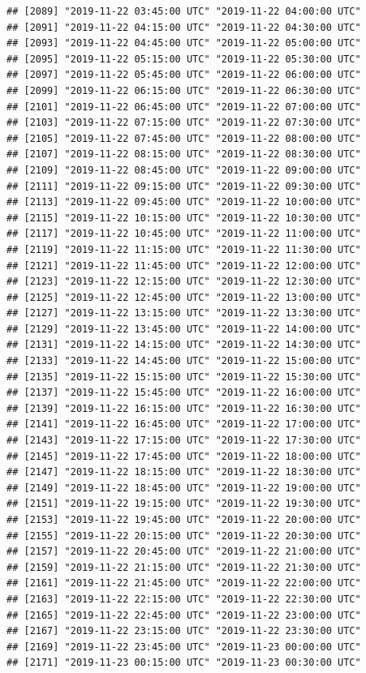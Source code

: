 \documentclass{article}\usepackage[]{graphicx}\usepackage[]{color}
\makeatletter
\newenvironment{kframe}{%
 \def\at@end@of@kframe{}%
 \ifinner\ifhmode%
  \def\at@end@of@kframe{\end{minipage}}%
  \begin{minipage}{\columnwidth}%
 \fi\fi%
 \def\FrameCommand##1{\hskip\@totalleftmargin \hskip-\fboxsep
 \colorbox{shadecolor}{##1}\hskip-\fboxsep
     \hskip-\linewidth \hskip-\@totalleftmargin \hskip\columnwidth}%
 \MakeFramed {\advance\hsize-\width
   \@totalleftmargin\z@ \linewidth\hsize
   \@setminipage}}%
 {\par\unskip\endMakeFramed%
 \at@end@of@kframe}
\newenvironment{knitrout}{}{} %
\makeatother
\begin{document}
\begin{knitrout}
\begin{kframe}
\begin{verbatim}
## [2089] "2019-11-22 03:45:00 UTC" "2019-11-22 04:00:00 UTC"
## [2091] "2019-11-22 04:15:00 UTC" "2019-11-22 04:30:00 UTC"
## [2093] "2019-11-22 04:45:00 UTC" "2019-11-22 05:00:00 UTC"
## [2095] "2019-11-22 05:15:00 UTC" "2019-11-22 05:30:00 UTC"
## [2097] "2019-11-22 05:45:00 UTC" "2019-11-22 06:00:00 UTC"
## [2099] "2019-11-22 06:15:00 UTC" "2019-11-22 06:30:00 UTC"
## [2101] "2019-11-22 06:45:00 UTC" "2019-11-22 07:00:00 UTC"
## [2103] "2019-11-22 07:15:00 UTC" "2019-11-22 07:30:00 UTC"
## [2105] "2019-11-22 07:45:00 UTC" "2019-11-22 08:00:00 UTC"
## [2107] "2019-11-22 08:15:00 UTC" "2019-11-22 08:30:00 UTC"
## [2109] "2019-11-22 08:45:00 UTC" "2019-11-22 09:00:00 UTC"
## [2111] "2019-11-22 09:15:00 UTC" "2019-11-22 09:30:00 UTC"
## [2113] "2019-11-22 09:45:00 UTC" "2019-11-22 10:00:00 UTC"
## [2115] "2019-11-22 10:15:00 UTC" "2019-11-22 10:30:00 UTC"
## [2117] "2019-11-22 10:45:00 UTC" "2019-11-22 11:00:00 UTC"
## [2119] "2019-11-22 11:15:00 UTC" "2019-11-22 11:30:00 UTC"
## [2121] "2019-11-22 11:45:00 UTC" "2019-11-22 12:00:00 UTC"
## [2123] "2019-11-22 12:15:00 UTC" "2019-11-22 12:30:00 UTC"
## [2125] "2019-11-22 12:45:00 UTC" "2019-11-22 13:00:00 UTC"
## [2127] "2019-11-22 13:15:00 UTC" "2019-11-22 13:30:00 UTC"
## [2129] "2019-11-22 13:45:00 UTC" "2019-11-22 14:00:00 UTC"
## [2131] "2019-11-22 14:15:00 UTC" "2019-11-22 14:30:00 UTC"
## [2133] "2019-11-22 14:45:00 UTC" "2019-11-22 15:00:00 UTC"
## [2135] "2019-11-22 15:15:00 UTC" "2019-11-22 15:30:00 UTC"
## [2137] "2019-11-22 15:45:00 UTC" "2019-11-22 16:00:00 UTC"
## [2139] "2019-11-22 16:15:00 UTC" "2019-11-22 16:30:00 UTC"
## [2141] "2019-11-22 16:45:00 UTC" "2019-11-22 17:00:00 UTC"
## [2143] "2019-11-22 17:15:00 UTC" "2019-11-22 17:30:00 UTC"
## [2145] "2019-11-22 17:45:00 UTC" "2019-11-22 18:00:00 UTC"
## [2147] "2019-11-22 18:15:00 UTC" "2019-11-22 18:30:00 UTC"
## [2149] "2019-11-22 18:45:00 UTC" "2019-11-22 19:00:00 UTC"
## [2151] "2019-11-22 19:15:00 UTC" "2019-11-22 19:30:00 UTC"
## [2153] "2019-11-22 19:45:00 UTC" "2019-11-22 20:00:00 UTC"
## [2155] "2019-11-22 20:15:00 UTC" "2019-11-22 20:30:00 UTC"
## [2157] "2019-11-22 20:45:00 UTC" "2019-11-22 21:00:00 UTC"
## [2159] "2019-11-22 21:15:00 UTC" "2019-11-22 21:30:00 UTC"
## [2161] "2019-11-22 21:45:00 UTC" "2019-11-22 22:00:00 UTC"
## [2163] "2019-11-22 22:15:00 UTC" "2019-11-22 22:30:00 UTC"
## [2165] "2019-11-22 22:45:00 UTC" "2019-11-22 23:00:00 UTC"
## [2167] "2019-11-22 23:15:00 UTC" "2019-11-22 23:30:00 UTC"
## [2169] "2019-11-22 23:45:00 UTC" "2019-11-23 00:00:00 UTC"
## [2171] "2019-11-23 00:15:00 UTC" "2019-11-23 00:30:00 UTC"

\end{verbatim}
\end{kframe}
\end{knitrout}
\end{document}
